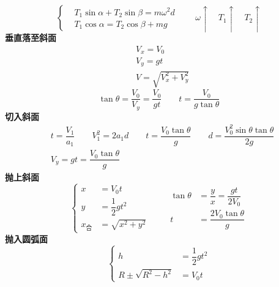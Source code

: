 \[
\left\{\begin{aligned}
&T_1\sin\alpha+T_2\sin\beta=m\omega^2d\\
&T_1\cos\alpha=T_2\cos\beta+mg
\end{aligned}\right.
\qquad \omega\uparrow\quad T_1\uparrow\quad T_2\uparrow
\]
\textbf{垂直落至斜面}
\begin{align*}
&V_x=V_0\\
&V_y=gt\\
&V=\sqrt{V_x^2+V_y^2}
\end{align*}
\[ \tan\theta=\dfrac{V_0}{V_y}=\dfrac{V_0}{gt}\qquad t=\dfrac{V_0}{g\tan\theta} \]
\textbf{切入斜面}
\begin{align*}
&t=\dfrac{V_1}{a_1}\qquad V_1^2=2a_1d\qquad t=\dfrac{V_0\tan\theta}{g}\qquad d=\dfrac{V_0^2\sin\theta\tan\theta}{2g}\\
&V_y=gt=\dfrac{V_0\tan\theta}{g}
\end{align*}
\textbf{抛上斜面}
\[
\left\{\begin{aligned}
x&=V_0t\\
y&=\dfrac12gt^2\\
x_{\text{合}}&=\sqrt{x^2+y^2}
\end{aligned}\right.
\qquad
\begin{aligned}
\tan\theta&=\dfrac{y}{x}=\dfrac{gt}{2V_0}\\
t&=\dfrac{2V_0\tan\theta}{g}
\end{aligned}
\]
\textbf{抛入圆弧面}
\[
\left\{\begin{aligned}
h&=\dfrac12gt^2\\
R\pm\sqrt{R^2-h^2}&=V_0t
\end{aligned}\right.
\]
